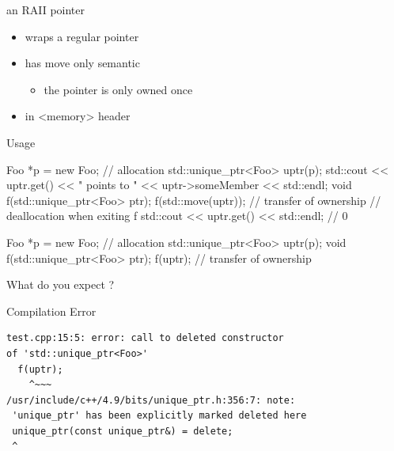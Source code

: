 \begin{frame}[fragile]
  \begin{block}{an RAII pointer}
    \begin{itemize}
    \item wraps a regular pointer
    \item has move only semantic
      \begin{itemize}
      \item the pointer is only owned once
      \end{itemize}
    \item in \textless{}memory\textgreater{} header
    \end{itemize}
  \end{block}
  \pause
  \begin{exampleblock}{Usage}
    \begin{cppcode*}{}
      Foo *p = new Foo{};  // allocation
      std::unique_ptr<Foo> uptr(p);
      std::cout << uptr.get() << " points to "
                << uptr->someMember << std::endl;
      void f(std::unique_ptr<Foo> ptr);
      f(std::move(uptr)); // transfer of ownership
      // deallocation when exiting f
      std::cout << uptr.get() << std::endl; // 0
    \end{cppcode*}
  \end{exampleblock}
\end{frame}

\begin{frame}[fragile]
  \begin{exampleblock}{}
    \begin{cppcode*}{}
      Foo *p = new Foo{};  // allocation
      std::unique_ptr<Foo> uptr(p);
      void f(std::unique_ptr<Foo> ptr);
      f(uptr); // transfer of ownership
    \end{cppcode*}
    What do you expect ?
  \end{exampleblock}
  \pause
  \begin{alertblock}{Compilation Error}
    \begin{verbatim}
test.cpp:15:5: error: call to deleted constructor
of 'std::unique_ptr<Foo>'
  f(uptr);
    ^~~~
/usr/include/c++/4.9/bits/unique_ptr.h:356:7: note:
 'unique_ptr' has been explicitly marked deleted here
 unique_ptr(const unique_ptr&) = delete;
 ^
    \end{verbatim}
  \end{alertblock}
\end{frame}

